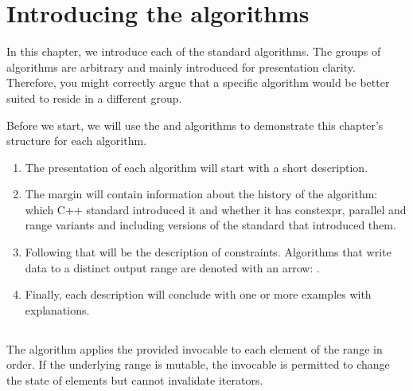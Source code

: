 \section{Introducing the algorithms}

In this chapter, we introduce each of the standard algorithms. The groups of algorithms are arbitrary and mainly introduced for presentation clarity. Therefore, you might correctly argue that a specific algorithm would be better suited to reside in a different group.

Before we start, we will use the  and  algorithms to demonstrate this chapter's structure for each algorithm.

\begin{enumerate}[label=\protect\circled{\arabic*}]
    \item The presentation of each algorithm will start with a short description.
    \item The margin will contain information about the history of the algorithm: which C++ standard introduced it and whether it has constexpr, parallel and range variants and including versions of the standard that introduced them.
    \item Following that will be the description of constraints. Algorithms that write data to a distinct output range are denoted with an arrow: \newline{}.
    \item Finally, each description will conclude with one or more examples with explanations.
\end{enumerate}

\subsection{\texorpdfstring{}{\texttt{std::for\_each}}}

 The  algorithm applies the provided invocable to each element of the range in order. If the underlying range is mutable, the invocable is permitted to change the state of elements but cannot invalidate iterators.


